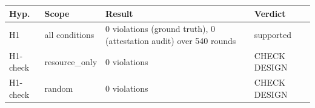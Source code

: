 \begin{tabular}{llll}
\toprule
Hyp. & Scope & Result & Verdict \\
\midrule
H1 & all conditions & 0 violations (ground truth), 0 (attestation audit) over 540 rounds & supported \\
H1-check & resource\_only & 0 violations & CHECK DESIGN \\
H1-check & random & 0 violations & CHECK DESIGN \\
\bottomrule
\end{tabular}
